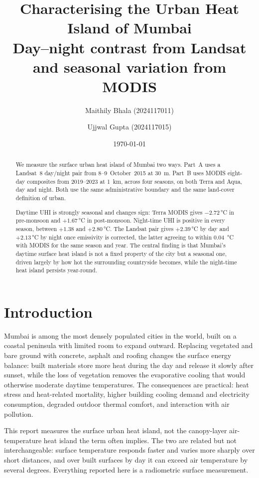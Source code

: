 \documentclass[11pt,a4paper]{article}
\title{Characterising the Urban Heat Island of Mumbai\\
  \large Day--night contrast from Landsat and seasonal
  variation from MODIS}
\author{Maithily Bhala (2024117011) \and
        Ujjwal Gupta (2024117015)}
\date{\today}
\begin{document}
\maketitle

\begin{abstract}
\noindent
We measure the surface urban heat island of Mumbai two ways. Part~A
uses a Landsat~8 day/night pair from 8--9~October~2015 at
\SI{30}{\metre}. Part~B uses MODIS eight-day composites from
2019--2023 at \SI{1}{\kilo\metre}, across four seasons, on both Terra
and Aqua, day and night. Both use the same administrative boundary and
the same land-cover definition of urban.

Daytime UHI is strongly seasonal
and changes sign: Terra MODIS gives $-2.72$\,\si{\degreeCelsius} in
pre-monsoon and $+1.67$\,\si{\degreeCelsius} in post-monsoon.
Night-time UHI is positive in every season, between $+1.38$ and
$+2.80$\,\si{\degreeCelsius}. The Landsat pair gives
$+2.39$\,\si{\degreeCelsius} by day and $+2.13$\,\si{\degreeCelsius}
by night once emissivity is corrected, the latter agreeing to within
\SI{0.04}{\degreeCelsius} with MODIS for the same season and year. The
central finding is that Mumbai's daytime surface heat island is not a
fixed property of the city but a seasonal one, driven largely by how
hot the surrounding countryside becomes, while the night-time heat
island persists year-round.
\end{abstract}

\section{Introduction}

Mumbai is among the most densely populated cities in the world, built
on a coastal peninsula with limited room to expand outward. Replacing
vegetated and bare ground with concrete, asphalt and roofing changes
the surface energy balance: built materials store more heat during the
day and release it slowly after sunset, while the loss of vegetation
removes the evaporative cooling that would otherwise moderate daytime
temperatures. The consequences are practical: heat stress and
heat-related mortality, higher building cooling demand and electricity
consumption, degraded outdoor thermal comfort, and interaction with
air pollution.

This report measures the surface urban heat island, not the canopy-layer
air-temperature heat island the term often implies. The two are related
but not interchangeable: surface temperature responds faster and varies
more sharply over short distances, and over built surfaces by day it can
exceed air temperature by several degrees. Everything reported here is a
radiometric surface measurement.
\end{document}
